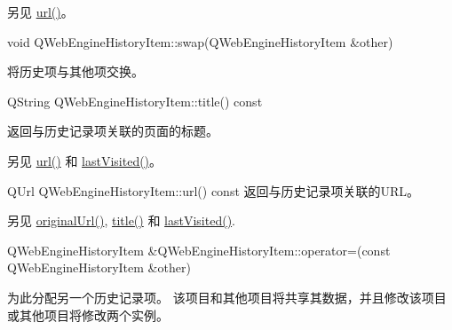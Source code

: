 另见 \href{https://github.com/QtDocumentCN/QtDocumentCN/blob/master/Src/W/QWebEngineHistoryItem/qwebenginehistoryitem.html#url}{url()}。

void QWebEngineHistoryItem::swap(QWebEngineHistoryItem \&other)

将历史项与其他项交换。

QString QWebEngineHistoryItem::title() const

返回与历史记录项关联的页面的标题。

另见 \href{https://github.com/QtDocumentCN/QtDocumentCN/blob/master/Src/W/QWebEngineHistoryItem/qwebenginehistoryitem.html#url}{url()} 和 \href{https://github.com/QtDocumentCN/QtDocumentCN/blob/master/Src/W/QWebEngineHistoryItem/qwebenginehistoryitem.html#lastVisited}{lastVisited()}。

QUrl QWebEngineHistoryItem::url() const
返回与历史记录项关联的URL。

另见 \href{https://github.com/QtDocumentCN/QtDocumentCN/blob/master/Src/W/QWebEngineHistoryItem/qwebenginehistoryitem.html#originalUrl}{originalUrl()}, \href{https://github.com/QtDocumentCN/QtDocumentCN/blob/master/Src/W/QWebEngineHistoryItem/qwebenginehistoryitem.html#title}{title()} 和 \href{https://github.com/QtDocumentCN/QtDocumentCN/blob/master/Src/W/QWebEngineHistoryItem/qwebenginehistoryitem.html#lastVisited}{lastVisited()}.

QWebEngineHistoryItem \&QWebEngineHistoryItem::operator=(const QWebEngineHistoryItem \&other)


为此分配另一个历史记录项。 该项目和其他项目将共享其数据，并且修改该项目或其他项目将修改两个实例。

